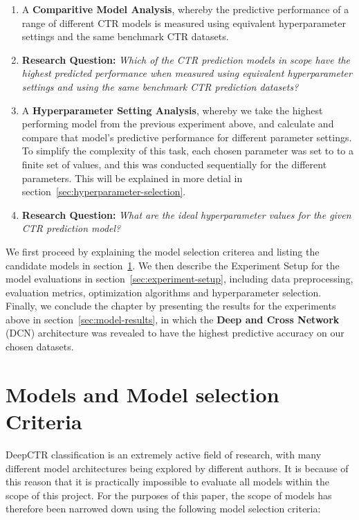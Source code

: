 \documentclass{mldsmsc}
\begin{document}
\begin{enumerate}
    \item \label{exp:comparative-model-analysis} A \textbf{Comparitive Model Analysis}, whereby the predictive performance of a range of different CTR models
    is measured using equivalent hyperparameter settings and the same benchmark CTR datasets.
    \item[] \textbf{Research Question:} \emph{Which of the CTR prediction models in scope have the highest predicted performance
    when measured using equivalent hyperparameter settings and using the same benchmark CTR prediction datasets?}
    \item \label{exp:hyperparameter-analysis} A \textbf{Hyperparameter Setting Analysis}, whereby we take the highest performing model from the previous
    experiment above, and calculate and compare that model's predictive performance for different parameter settings. To
    simplify the complexity of this task, each chosen parameter was set to to a finite set of values, and this was conducted
    sequentially for the different parameters. This will be explained in more detial in section~\ref{sec:hyperparameter-selection}.
    \item[] \textbf{Research Question:} \emph{What are the ideal hyperparameter values for the given CTR prediction model?}
\end{enumerate}


We first proceed by explaining the model selection criterea and listing the candidate models in section~\ref{sec:model-selection}.
We then describe the Experiment Setup for the model evaluations in section~\ref{sec:experiment-setup}, including
data preprocessing, evaluation metrics, optimization algorithms and hyperparameter selection. Finally, we conclude the chapter
by presenting the results for the experiments above in section~\ref{sec:model-results}, in which the \textbf{Deep and Cross Network} (DCN) architecture \citep{RefWorks:wang2017deep}
was revealed to have the highest predictive accuracy on our chosen datasets.

\section{Models and Model selection Criteria}
\label{sec:model-selection}

DeepCTR classification is an extremely active field of research, with many
different model architectures being explored by different authors. It is because of this
reason that it is practically impossible to evaluate all models within the scope
of this project. For the purposes of this paper, the scope of models has therefore
been narrowed down using the following model selection criteria:
\end{document}
